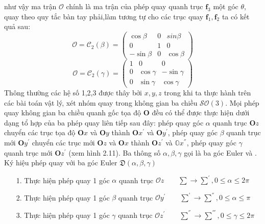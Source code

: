   như vậy ma trận $\mathcal{O}$ chính là ma trận của phép quay quanh trục $\mathbf{f}_3$ một góc $\theta$, quay theo quy tắc bàn tay phải,làm tương tự cho các trục quay $\mathbf{f}_1,\mathbf{f}_2$ ta có kết quả sau:
  \begin{equation}
  \mathcal{O}=\mathcal{C}_2(\beta)=\begin{pmatrix}
  \cos\beta &0 &sin\beta\\
  0 &1 & 0\\
  -\sin\beta &0 &\cos\beta
  \end{pmatrix}
  \end{equation}
  \begin{equation}
  \mathcal{O}=\mathcal{C}_2(\gamma)=\begin{pmatrix}
  1 &0 &0 \\
  0 &\cos\gamma &-\sin\gamma\\
  0 &\sin\gamma &\cos\gamma
  \end{pmatrix}
  \end{equation}
  Thông thường các hệ số 1,2,3 được thây bởi $\mathit{x,y,z}$ trong khi ta thực hành trên các bài toán vật lý, xét nhóm quay trong không gian ba chiều $\mathcal{SO}(3)$. Mọi phép quay không gian ba chiều quanh gốc tọa độ $\mathbf{O}$ đều có thể được thực hiện dưới dạng tổ hợp của ba phép quay liên tiếp sau đây: phép quay góc $\alpha$ quanh trục $\mathbf{O}\mathit{z}$ chuyển các trục tọa độ $\mathbf{O}\mathit{x}$ và $\mathbf{O}\mathit{y}$ thành $\mathbf{O}\mathit{x}^{'}$ và $\mathbf{O}\mathit{y}^{'}$, 
  phép quay góc $\beta$ quanh trục mới $\mathbf{O}\mathit{y}^{'}$ chuyển
  các trục mới $\mathbf{O}\mathit{z}$ và $\mathbf{O}\mathit{x}$ thành $\mathbf{O}\mathit{z}^{'}$ và $\mathbb{O}\mathit{x}^{''}$, phép quay góc $\gamma$ quanh trục mới $\mathbf{O}\mathit{z}^{'}$ (xem hình 2.11). Ba thông
  số $\alpha,\beta,\gamma$ gọi là ba góc Euler và . Ký hiệu phép quay với ba góc Euler $\mathfrak{D}(\alpha,\beta,\gamma)$\\
  \begin{enumerate}
  \item[1.] Thực hiện phép quay 1 góc $\alpha$ quanh trục $\mathcal{O}z\qquad\sum\longrightarrow\sum^{'},0\leq \alpha\leq 2\pi$ 
  \item[2.] Thực hiện phép quay 1 góc $\beta$ quanh trục $\mathcal{O}y^{'}\qquad\sum^{'}\longrightarrow\sum^{''},0\leq \alpha\leq \pi$ 
  \item[3.] Thực hiện phép quay 1 góc $\gamma$ quanh trục $\mathcal{O}z^{'}\qquad\sum^{''}\longrightarrow\sum^{'''},0\leq \gamma\leq 2\pi$ 
  \end{enumerate}

